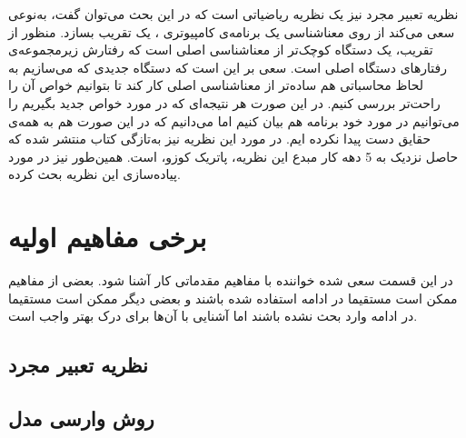 نظریه تعبیر مجرد\cite{cousot1} نیز یک نظریه ریاضیاتی است که در این بحث می‌توان گفت، به‌نوعی سعی می‌کند از روی معناشناسی یک برنامه‌ی کامپیوتری\cite{winskel} ، یک تقریب بسازد. منظور از تقریب، یک دستگاه کوچک‌تر از معناشناسی اصلی است که رفتارش زیرمجموعه‌ی رفتارهای دستگاه اصلی است. سعی بر این است که دستگاه جدیدی که می‌سازیم به لحاظ محاسباتی هم ساده‌تر از معناشناسی اصلی کار کند تا بتوانیم خواص آن را راحت‌تر بررسی کنیم. در این صورت هر نتیجه‌ای که در مورد خواص جدید بگیریم را می‌توانیم در مورد خود برنامه هم بیان کنیم اما می‌دانیم که در این صورت هم به همه‌ی حقایق دست پیدا نکرده ایم. در مورد این نظریه نیز به‌تازگی کتاب\cite{cousotbook} منتشر شده که حاصل نزدیک به 5 دهه کار مبدع این نظریه، پاتریک کوزو، است. همین‌طور\cite{statica} نیز در مورد پیاده‌سازی این نظریه بحث کرده.


\section{برخی مفاهیم اولیه}
در این قسمت سعی شده خواننده با مفاهیم مقدماتی کار آشنا شود. بعضی از مفاهیم ممکن است مستقیما در ادامه استفاده شده باشند و بعضی دیگر ممکن است مستقیما در ادامه وارد بحث نشده باشند اما آشنایی با آن‌ها برای درک بهتر واجب است.
\subsection{نظریه تعبیر مجرد}

\subsection{روش وارسی مدل}

